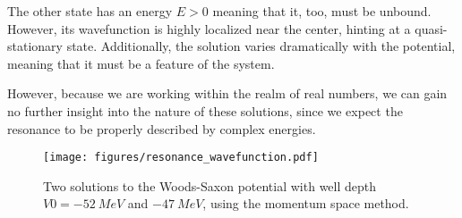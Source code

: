 The other state has an energy $E>0$ meaning that it, too, must be unbound. However, its wavefunction is highly localized near the center, hinting at a quasi-stationary state. Additionally, the solution varies dramatically with the potential, meaning that it must be a feature of the system. 

However, because we are working within the realm of real numbers, we can gain no further insight into the nature of these solutions, since we expect the resonance to be properly described by complex energies. 

\begin{figure}
  \centering
  \texttt{[image: figures/resonance\_wavefunction.pdf]}
  \caption{Two solutions to the Woods-Saxon potential with well depth $V0=\SI{-52}{MeV}$ and $\SI{-47}{MeV}$, using the momentum space method.}
  \label{fig:resonance wavefunction}
\end{figure}


